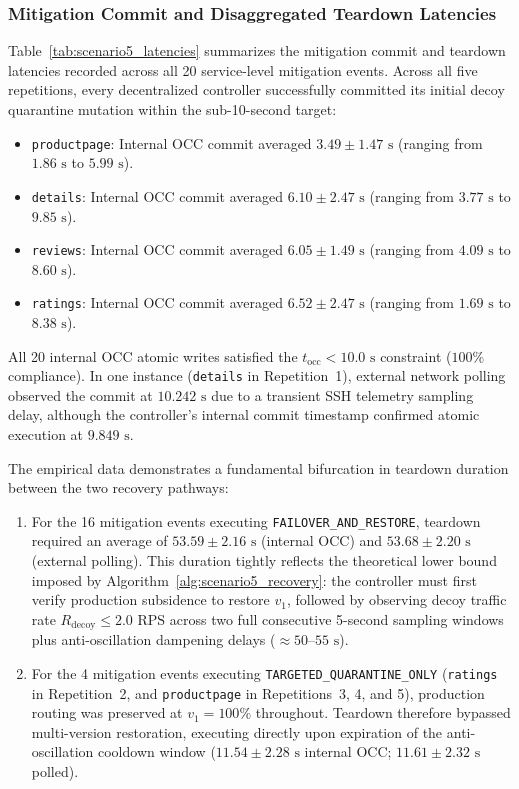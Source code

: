 \subsubsection{Mitigation Commit and Disaggregated Teardown Latencies}

Table~\ref{tab:scenario5_latencies} summarizes the mitigation commit and teardown latencies recorded across all 20 service-level mitigation events. Across all five repetitions, every decentralized controller successfully committed its initial decoy quarantine mutation within the sub-10-second target:
\begin{itemize}
    \item \texttt{productpage}: Internal OCC commit averaged $3.49 \pm 1.47\text{ s}$ (ranging from $1.86\text{ s}$ to $5.99\text{ s}$).
    \item \texttt{details}: Internal OCC commit averaged $6.10 \pm 2.47\text{ s}$ (ranging from $3.77\text{ s}$ to $9.85\text{ s}$).
    \item \texttt{reviews}: Internal OCC commit averaged $6.05 \pm 1.49\text{ s}$ (ranging from $4.09\text{ s}$ to $8.60\text{ s}$).
    \item \texttt{ratings}: Internal OCC commit averaged $6.52 \pm 2.47\text{ s}$ (ranging from $1.69\text{ s}$ to $8.38\text{ s}$).
\end{itemize}
All 20 internal OCC atomic writes satisfied the $t_{\text{occ}} < 10.0\text{ s}$ constraint ($100\%$ compliance). In one instance (\texttt{details} in Repetition~1), external network polling observed the commit at $10.242\text{ s}$ due to a transient SSH telemetry sampling delay, although the controller's internal commit timestamp confirmed atomic execution at $9.849\text{ s}$.

The empirical data demonstrates a fundamental bifurcation in teardown duration between the two recovery pathways:
\begin{enumerate}
    \item For the 16 mitigation events executing \texttt{FAILOVER\_AND\_RESTORE}, teardown required an average of $53.59 \pm 2.16\text{ s}$ (internal OCC) and $53.68 \pm 2.20\text{ s}$ (external polling). This duration tightly reflects the theoretical lower bound imposed by Algorithm~\ref{alg:scenario5_recovery}: the controller must first verify production subsidence to restore $v_1$, followed by observing decoy traffic rate $R_{\text{decoy}} \le 2.0\text{ RPS}$ across two full consecutive 5-second sampling windows plus anti-oscillation dampening delays ($\approx 50\text{--}55\text{ s}$).
    \item For the 4 mitigation events executing \texttt{TARGETED\_QUARANTINE\_ONLY} (\texttt{ratings} in Repetition~2, and \texttt{productpage} in Repetitions~3, 4, and 5), production routing was preserved at $v_1=100\%$ throughout. Teardown therefore bypassed multi-version restoration, executing directly upon expiration of the anti-oscillation cooldown window ($11.54 \pm 2.28\text{ s}$ internal OCC; $11.61 \pm 2.32\text{ s}$ polled).
\end{enumerate}

